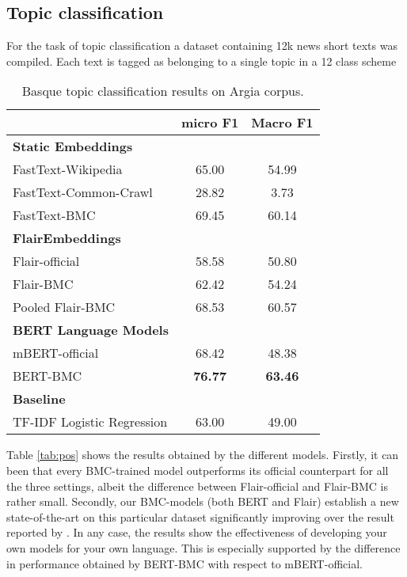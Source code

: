 \documentclass[10pt, a4paper]{article}
\begin{document}
\subsection{Topic classification}\label{sec:topic}
For the task of topic classification a dataset containing 12k news short texts was compiled. Each text is tagged as belonging to a single topic in a 12 class scheme

\begin{table}[!t]\small
\centering
\begin{tabular}{@{\hspace{0.3cm}}lcc} \hline
 {\textbf{}} & {\textbf{micro F1}} &  {\textbf{Macro F1}} \\ \hline
\textbf{Static Embeddings} & & \\
FastText-Wikipedia & 65.00 & 54.99 \\
FastText-Common-Crawl & 28.82 & 3.73  \\
FastText-BMC  & 69.45 & 60.14 \\
\hline%
\textbf{FlairEmbeddings}\\
Flair-official & 58.58 & 50.80 \\
Flair-BMC  & 62.42	& 54.24  \\
Pooled Flair-BMC  & 68.53 & 60.57  \\ \hline
\textbf{BERT Language Models}\\
mBERT-official  & 68.42 & 48.38  \\
BERT-BMC  & \textbf{76.77}	& \textbf{63.46}  \\
\hline 
\textbf{Baseline} \\
TF-IDF Logistic Regression & 63.00 & 49.00 \\
\hline
\end{tabular}
\caption{Basque topic classification results on Argia corpus.}\label{tab:topic}
\end{table}


Table \ref{tab:pos} shows the results obtained by the different models. Firstly, it can been that every BMC-trained model outperforms its official counterpart for all the three settings, albeit the difference between Flair-official and Flair-BMC is rather small. Secondly, our BMC-models (both BERT and Flair) establish a new state-of-the-art on this particular dataset significantly improving over the result reported by \cite{plank-etal-2016-multilingual}. In any case, the results show the effectiveness of developing your own models for your own language. This is especially supported by the difference in performance obtained by BERT-BMC with respect to mBERT-official.
\end{document}
